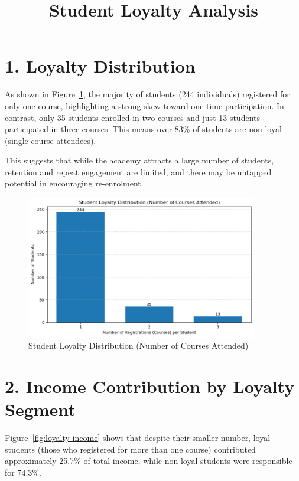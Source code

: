 \documentclass[12pt,a4paper]{article}
\title{Student Loyalty Analysis}
\date{}
\begin{document}
\maketitle

\section*{1. Loyalty Distribution}
As shown in Figure~\ref{fig:loyalty-distribution}, the majority of students (244 individuals) registered for only one course, highlighting a strong skew toward one-time participation. In contrast, only 35 students enrolled in two courses and just 13 students participated in three courses. This means over 83\% of students are non-loyal (single-course attendees).

This suggests that while the academy attracts a large number of students, retention and repeat engagement are limited, and there may be untapped potential in encouraging re-enrolment.

\begin{figure}[h!]
    \centering
    \includegraphics[width=0.9\textwidth]{Student Loyalty Distribution (Number of Courses Attended).png}
    \caption{Student Loyalty Distribution (Number of Courses Attended)}
    \label{fig:loyalty-distribution}
\end{figure}

\section*{2. Income Contribution by Loyalty Segment}
Figure~\ref{fig:loyalty-income} shows that despite their smaller number, loyal students (those who registered for more than one course) contributed approximately 25.7\% of total income, while non-loyal students were responsible for 74.3\%.
\end{document}
